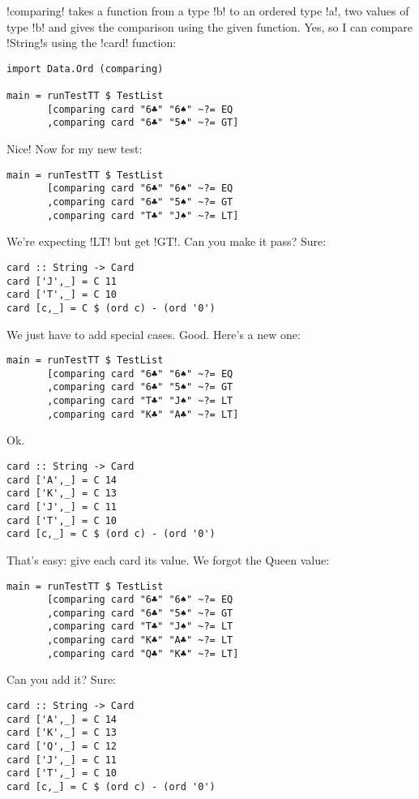 \il!comparing! takes a function from a type \il!b! to an ordered type \il!a!, two values of type \il!b! and gives the comparison using the given function.
\lhN Yes, so I can compare \il!String!s using the \il!card! function:
\begin{lstlisting}[frame=single]
import Data.Ord (comparing)

main = runTestTT $ TestList 
       [comparing card "6♣" "6♠" ~?= EQ
       ,comparing card "6♣" "5♠" ~?= GT]
\end{lstlisting} %
\hspace*{\fill}
\lhA \success Nice!
\lhN Now for my new test:
\begin{lstlisting}[frame=single]
main = runTestTT $ TestList 
       [comparing card "6♣" "6♠" ~?= EQ
       ,comparing card "6♣" "5♠" ~?= GT
       ,comparing card "T♣" "J♠" ~?= LT]
\end{lstlisting} %
\failure We're expecting \il!LT! but get \il!GT!. Can you make it pass?
\lhA
\failure Sure:
\begin{lstlisting}[frame=single]
card :: String -> Card
card ['J',_] = C 11
card ['T',_] = C 10
card [c,_] = C $ (ord c) - (ord '0')
\end{lstlisting} %
\success We just have to add special cases.
\lhN Good. Here's a new one:
\begin{lstlisting}[frame=single]
main = runTestTT $ TestList 
       [comparing card "6♣" "6♠" ~?= EQ
       ,comparing card "6♣" "5♠" ~?= GT
       ,comparing card "T♣" "J♠" ~?= LT
       ,comparing card "K♣" "A♣" ~?= LT]
\end{lstlisting} %
\hspace*{\fill} 
\lhA \failure Ok. 
\begin{lstlisting}[frame=single]
card :: String -> Card
card ['A',_] = C 14
card ['K',_] = C 13
card ['J',_] = C 11
card ['T',_] = C 10
card [c,_] = C $ (ord c) - (ord '0')
\end{lstlisting} %
\success That's easy: give each card its value.
\lhN We forgot the Queen value:
\begin{lstlisting}[frame=single]
main = runTestTT $ TestList 
       [comparing card "6♣" "6♠" ~?= EQ
       ,comparing card "6♣" "5♠" ~?= GT
       ,comparing card "T♣" "J♠" ~?= LT
       ,comparing card "K♣" "A♣" ~?= LT
       ,comparing card "Q♣" "K♣" ~?= LT]
\end{lstlisting} %
Can you add it?
\lhA \failure Sure:
\begin{lstlisting}[frame=single]
card :: String -> Card
card ['A',_] = C 14
card ['K',_] = C 13
card ['Q',_] = C 12
card ['J',_] = C 11
card ['T',_] = C 10
card [c,_] = C $ (ord c) - (ord '0')
\end{lstlisting} %
